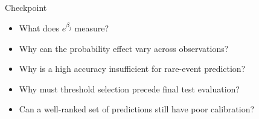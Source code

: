 \begin{frame}{Checkpoint}
\begin{itemize}
\item What does $e^{\beta_j}$ measure?
\item Why can the probability effect vary across observations?
\item Why is a high accuracy insufficient for rare-event prediction?
\item Why must threshold selection precede final test evaluation?
\item Can a well-ranked set of predictions still have poor calibration?
\end{itemize}
\end{frame}
